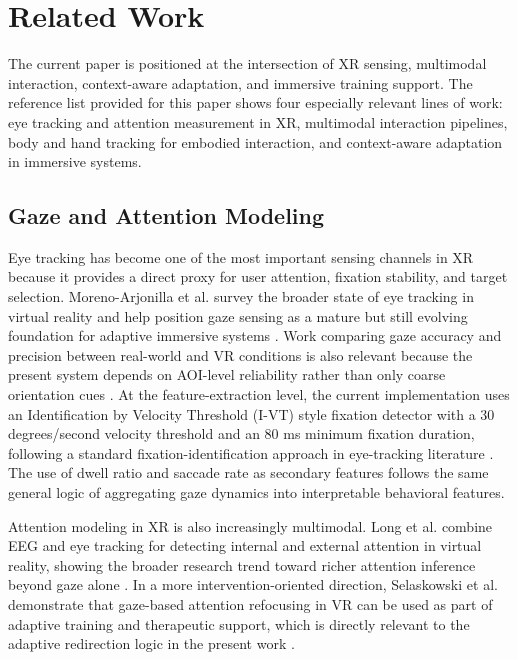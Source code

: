 \documentclass[10pt,twocolumn]{article}
\begin{document}
\section{Related Work}
The current paper is positioned at the intersection of XR sensing, multimodal interaction, context-aware adaptation, and immersive training support. The reference list provided for this paper shows four especially relevant lines of work: eye tracking and attention measurement in XR, multimodal interaction pipelines, body and hand tracking for embodied interaction, and context-aware adaptation in immersive systems.

\subsection{Gaze and Attention Modeling}
Eye tracking has become one of the most important sensing channels in XR because it provides a direct proxy for user attention, fixation stability, and target selection. Moreno-Arjonilla et al. survey the broader state of eye tracking in virtual reality and help position gaze sensing as a mature but still evolving foundation for adaptive immersive systems \cite{moreno2024}. Work comparing gaze accuracy and precision between real-world and VR conditions is also relevant because the present system depends on AOI-level reliability rather than only coarse orientation cues \cite{gazecomparison2020}. At the feature-extraction level, the current implementation uses an Identification by Velocity Threshold (I-VT) style fixation detector with a 30 degrees/second velocity threshold and an 80 ms minimum fixation duration, following a standard fixation-identification approach in eye-tracking literature \cite{salvucci2000}. The use of dwell ratio and saccade rate as secondary features follows the same general logic of aggregating gaze dynamics into interpretable behavioral features.

Attention modeling in XR is also increasingly multimodal. Long et al. combine EEG and eye tracking for detecting internal and external attention in virtual reality, showing the broader research trend toward richer attention inference beyond gaze alone \cite{long2024}. In a more intervention-oriented direction, Selaskowski et al. demonstrate that gaze-based attention refocusing in VR can be used as part of adaptive training and therapeutic support, which is directly relevant to the adaptive redirection logic in the present work \cite{selaskowski2023}.
\end{document}

